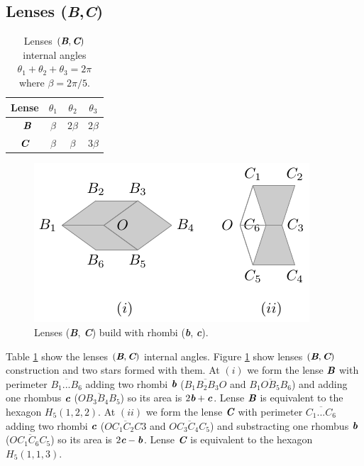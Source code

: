 \documentclass[11pt]{article}
\def\mathbi#1{\textbf{\em #1}}
\begin{document}
\subsection{Lenses (\mathbi{B},\mathbi{C})}

\begin{table}[H]
\begin{center}
\begin{tabular}{|c|c c c|} \hline
Lense & $\theta_1$ & $\theta_2$ & $\theta_3$ \\ \hline\
$\mathbi{B}$ & $\beta$ & $2\beta$ & $2\beta$ \\[0.5ex] \hline
$\mathbi{C}$ & $\beta$ & $\beta$ & $3\beta$ \\[0.5ex] \hline
\end{tabular}
\caption{Lenses $(\mathbi{B},\mathbi{C})$ internal angles $\theta_1+\theta_2+\theta_3 = 2\pi$ where $\beta = 2\pi/5$.} 
\label{tbl:bc-lenses-angles}
\end{center}
\end{table}

\begin{figure}[H]
\centering
\includegraphics[scale=1.1]{bc/bc}
\caption{Lenses (\mathbi{B}, \mathbi{C}) build with rhombi (\mathbi{b}, \mathbi{c}).}
\label{fig:bc-lenses}
\end{figure}

Table \ref{tbl:bc-lenses-angles} show the lenses $(\mathbi{B},\mathbi{C})$ internal angles.
Figure \ref{fig:bc-lenses} show lenses $(\mathbi{B},\mathbi{C})$ construction and two stars formed with them.
At $(i)$ we form the lense $\mathbi{B}$ with perimeter $\overline{B_1...B_6}$ adding two rhombi $\mathbi{b}$ ($\overline{B_1B_2B_3O}$ and $\overline{B_1OB_5B_6}$) and adding one rhombus $\mathbi{c}$ ($\overline{OB_3B_4B_5}$) so its area is $2\mathbi{b} + \mathbi{c}$. Lense $\mathbi{B}$ is equivalent to the hexagon $H_5(1,2,2)$.
At $(ii)$ we form the lense $\mathbi{C}$ with perimeter $\overline{C_1...C_6}$ adding two rhombi $\mathbi{c}$ ($\overline{OC_1C_2C3}$ and $\overline{OC_3C_4C_5}$) and substracting one rhombus $\mathbi{b}$ ($\overline{OC_1C_6C_5}$) so its area is $2\mathbi{c} - \mathbi{b}$. Lense $\mathbi{C}$ is equivalent to the hexagon $H_5(1,1,3)$.
\end{document}
